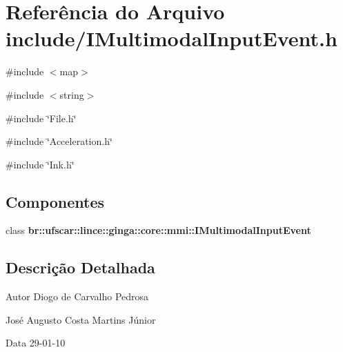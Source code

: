 \section{Referência do Arquivo include/IMultimodalInputEvent.h}
\label{IMultimodalInputEvent_8h}
{\ttfamily \#include $<$map$>$}\par
{\ttfamily \#include $<$string$>$}\par
{\ttfamily \#include \char`\"{}File.h\char`\"{}}\par
{\ttfamily \#include \char`\"{}Acceleration.h\char`\"{}}\par
{\ttfamily \#include \char`\"{}Ink.h\char`\"{}}\par
\subsection*{Componentes}
\begin{DoxyCompactItemize}
\item 
class {\bf br::ufscar::lince::ginga::core::mmi::IMultimodalInputEvent}
\end{DoxyCompactItemize}


\subsection{Descrição Detalhada}
\begin{DoxyAuthor}{Autor}
Diogo de Carvalho Pedrosa 

José Augusto Costa Martins Júnior 
\end{DoxyAuthor}
\begin{DoxyDate}{Data}
29-\/01-\/10 
\end{DoxyDate}
